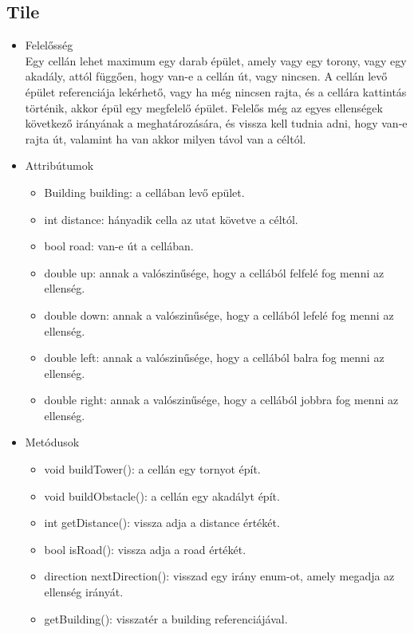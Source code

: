 \subsection{Tile}
\begin{itemize}
\item Felelősség\\
Egy cellán lehet maximum egy darab épület, amely vagy egy torony, vagy egy akadály, attól függően, hogy van-e a cellán út, vagy nincsen. A cellán levő épület referenciája lekérhető, vagy ha még nincsen rajta, és a cellára kattintás történik, akkor épül egy megfelelő épület. Felelős még az egyes ellenségek következő irányának a meghatározására, és vissza kell tudnia adni, hogy van-e rajta út, valamint ha van akkor milyen távol van a céltól.
\item Attribútumok\\
	\begin{itemize}
		\item Building building: a cellában levő epület.
		\item int distance: hányadik cella az utat követve a céltól.
		\item bool road: van-e út a cellában.
		\item double up: annak a valószinűsége, hogy a cellából felfelé fog menni az ellenség.
		\item double down: annak a valószinűsége, hogy a cellából lefelé fog menni az ellenség.
		\item double left: annak a valószinűsége, hogy a cellából balra fog menni az ellenség.
		\item double right: annak a valószinűsége, hogy a cellából jobbra fog menni az ellenség.
	\end{itemize}
\item Metódusok\\
	\begin{itemize}
		\item void buildTower(): a cellán egy tornyot épít.
		\item void buildObstacle(): a cellán egy akadályt épít.
		\item int getDistance(): vissza adja a distance értékét.
		\item bool isRoad(): vissza adja a road értékét.
		\item direction nextDirection(): visszad egy irány enum-ot, amely megadja az ellenség irányát.
		\item getBuilding(): visszatér a building referenciájával.
	\end{itemize}
\end{itemize}



